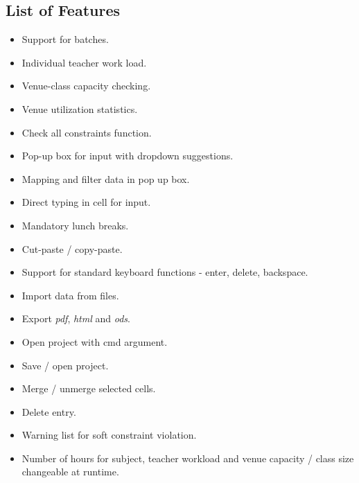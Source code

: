 \subsection{List of Features}
\noindent
\begin{itemize}
\item Support for batches.
\item Individual teacher work load.
\item Venue-class capacity checking.
\item Venue utilization statistics.
\item Check all constraints function.
\item Pop-up box for input with dropdown suggestions.
\item Mapping and filter data in pop up box.
\item Direct typing in cell for input.
\item Mandatory lunch breaks.
\item Cut-paste / copy-paste.
\item Support for standard keyboard functions - enter, delete, backspace.
\item Import data from files.
\item Export \textit{pdf}, \textit{html} and \textit{ods}.
\item Open project with cmd argument. 
\item Save / open project.
\item Merge / unmerge selected cells.
\item Delete entry.
\item Warning list for soft constraint violation.
\item Number of hours for subject, teacher workload and venue capacity / class size changeable at runtime.

\end{itemize}
 
 
